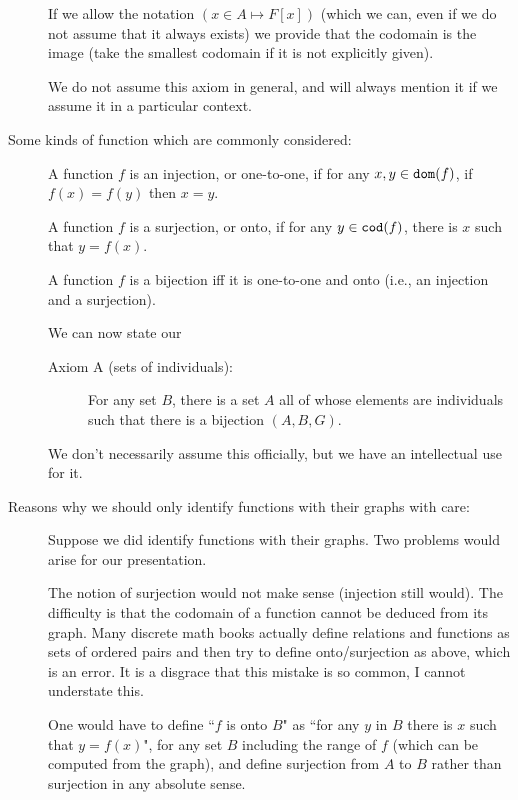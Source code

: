 \documentclass[12pt]{article}
\begin{document}
\begin{description}
If we allow the notation $(x \in A \mapsto F[x])$ (which we can, even if we do not assume that it always exists) we provide that the codomain is the image (take the smallest codomain if it is not explicitly given).

We do not assume this axiom in general, and will always mention it if we assume it in a particular context.

\item[Some kinds of function which are commonly considered:]

A function $f$ is an injection, or one-to-one, if for any $x,y \in {\tt dom}(f)$, if $f(x)=f(y)$ then $x=y$.

A function $f$ is a surjection, or onto, if for any $y \in {\tt cod}(f)$, there is $x$ such that $y = f(x)$.

A function $f$ is a bijection iff it is one-to-one and onto (i.e., an injection and a surjection).

We can now state our

\begin{description}

\item[Axiom A (sets of individuals):]  For any set $B$, there is a set $A$ all of whose elements are individuals such
that there is a bijection $(A,B,G)$.

\end{description}

We don't necessarily assume this officially, but we have an intellectual use for it.

\item[Reasons why we should only identify functions with their graphs with care:]

Suppose we did identify functions with their graphs.  Two problems would arise for our presentation.

The notion of surjection would not make sense (injection still would).  The difficulty is that
the codomain of a function cannot be deduced from its graph.  Many discrete math books actually
define relations and functions as sets of ordered pairs and then try to define onto/surjection as above, which is an error.  It is a disgrace that this mistake is so common, I cannot understate this.

One would have to define ``$f$ is onto $B$" as ``for any $y$ in $B$ there is $x$ such that $y=f(x)$", for any set
$B$ including the range of $f$ (which can be computed from the graph), and define surjection from $A$ to $B$ rather than surjection in any absolute sense.


\end{description}
\end{document}
